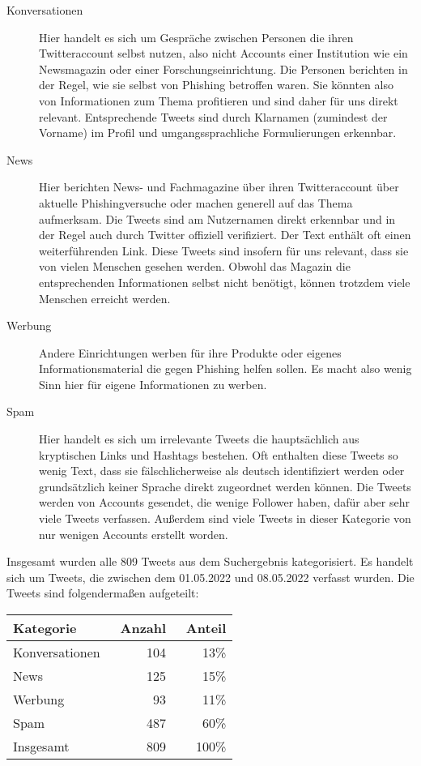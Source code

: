 \documentclass[runningheads]{llncs}
\begin{document}
\begin{description}
    \item [Konversationen] Hier handelt es sich um Gespräche zwischen Personen die ihren Twitteraccount selbst nutzen, also nicht Accounts einer Institution wie ein Newsmagazin oder einer Forschungseinrichtung.
    Die Personen berichten in der Regel, wie sie selbst von Phishing betroffen waren.
    Sie könnten also von Informationen zum Thema profitieren und sind daher für uns direkt relevant.
    Entsprechende Tweets sind durch Klarnamen (zumindest der Vorname) im Profil und umgangssprachliche Formulierungen erkennbar.
    \item [News] Hier berichten News- und Fachmagazine über ihren Twitteraccount über aktuelle Phishingversuche oder machen generell auf das Thema aufmerksam.
    Die Tweets sind am Nutzernamen direkt erkennbar und in der Regel auch durch Twitter offiziell verifiziert.
    Der Text enthält oft einen weiterführenden Link.
    Diese Tweets sind insofern für uns relevant, dass sie von vielen Menschen gesehen werden.
    Obwohl das Magazin die entsprechenden Informationen selbst nicht benötigt, können trotzdem viele Menschen erreicht werden.
    \item [Werbung] Andere Einrichtungen werben für ihre Produkte oder eigenes Informationsmaterial die gegen Phishing helfen sollen.
    Es macht also wenig Sinn hier für eigene Informationen zu werben.
    \item [Spam] Hier handelt es sich um irrelevante Tweets die hauptsächlich aus kryptischen Links und Hashtags bestehen.
    Oft enthalten diese Tweets so wenig Text, dass sie fälschlicherweise als deutsch identifiziert werden oder grundsätzlich keiner Sprache direkt zugeordnet werden können.
    Die Tweets werden von Accounts gesendet, die wenige Follower haben, dafür aber sehr viele Tweets verfassen.
    Außerdem sind viele Tweets in dieser Kategorie von nur wenigen Accounts erstellt worden.
\end{description}

Insgesamt wurden alle 809 Tweets aus dem Suchergebnis kategorisiert.
Es handelt sich um Tweets, die zwischen dem 01.05.2022 und 08.05.2022 verfasst wurden.
Die Tweets sind folgendermaßen aufgeteilt:
\begin{center}
\begin{tabular}{ l r  r }
Kategorie & \, Anzahl & \, Anteil \\ \hline
Konversationen & 104 & 13\% \\
News & 125 & 15\% \\
Werbung & 93 & 11\% \\
Spam & 487 & 60\% \\ \hline
Insgesamt & 809 & 100\% \\
\end{tabular}
\end{center}
\end{document}

